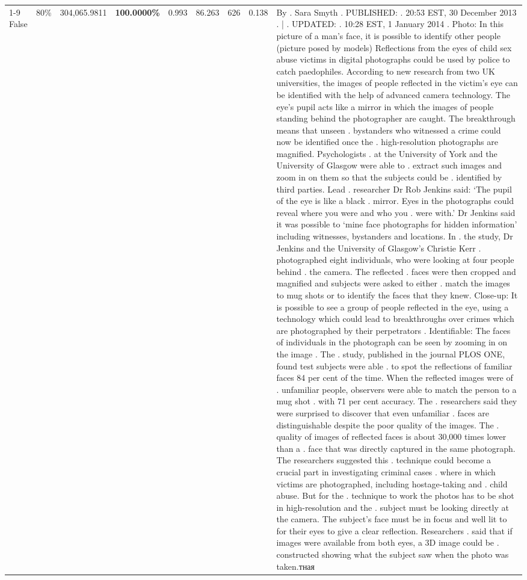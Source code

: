 \begin{table}[H]
\begin{tabular}{lllrlllll}
\cline{1-9} \cline{2-9}
False & 80\% & 304,065.9811 & \bfseries \color{red} 100.0000\% & 0.993 & 86.263 & 626 & 0.138 & By . Sara Smyth . PUBLISHED: . 20:53 EST, 30 December 2013 . | . UPDATED: . 10:28 EST, 1 January 2014 . Photo: In this picture of a man's face, it is possible to identify other people (picture posed by models) Reflections from the eyes of child sex abuse victims in digital photographs could be used by police to catch paedophiles. According to new research from two UK universities, the images of people reflected in the victim's eye can be identified with the help of advanced camera technology. The eye's pupil acts like a mirror in which the images of people standing behind the photographer are caught. The breakthrough means that unseen . bystanders who witnessed a crime could now be identified once the . high-resolution photographs are magnified. Psychologists . at the University of York and the University of Glasgow were able to . extract such images and zoom in on them so that the subjects could be . identified by third parties. Lead . researcher Dr Rob Jenkins said: ‘The pupil of the eye is like a black . mirror. Eyes in the photographs could reveal where you were and who you . were with.' Dr Jenkins said it was possible to ‘mine face photographs for hidden information' including witnesses, bystanders and locations. In . the study, Dr Jenkins and the University of Glasgow's Christie Kerr . photographed eight individuals, who were looking at four people behind . the camera. The reflected . faces were then cropped and magnified and subjects were asked to either . match the images to mug shots or to identify the faces that they knew. Close-up: It is possible to see a group of people reflected in the eye, using a technology which could lead to breakthroughs over crimes which are photographed by their perpetrators . Identifiable: The faces of individuals in the photograph can be seen by zooming in on the image . The . study, published in the journal PLOS ONE, found test subjects were able . to spot the reflections of familiar faces 84 per cent of the time. When the reflected images were of . unfamiliar people, observers were able to match the person to a mug shot . with 71 per cent accuracy. The . researchers said they were surprised to discover that even unfamiliar . faces are distinguishable despite the poor quality of the images. The . quality of images of reflected faces is about 30,000 times lower than a . face that was directly captured in the same photograph. The researchers suggested this . technique could become a crucial part in investigating criminal cases . where in which victims are photographed, including hostage-taking and . child abuse. But for the . technique to work the photos has to be shot in high-resolution and the . subject must be looking directly at the camera. The subject's face must be in focus and well lit to for their eyes to give a clear reflection. Researchers . said that if images were available from both eyes, a 3D image could be . constructed showing what the subject saw when the photo was taken.тная \\

\end{tabular}
\end{table}
